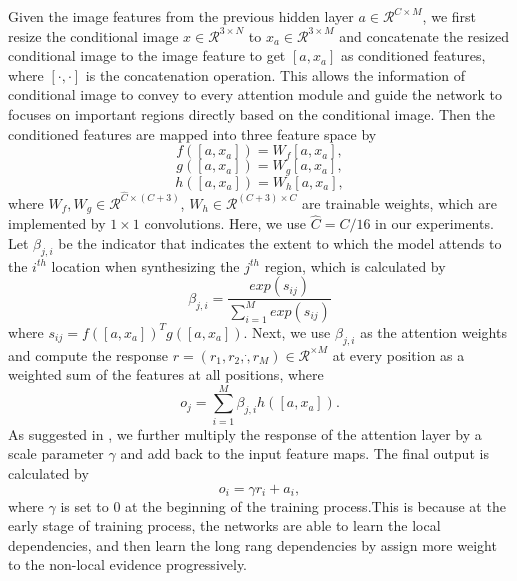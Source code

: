 Given the image features from the previous hidden layer $a\in \mathcal{R}^{C\times M}$, we first resize the conditional image $x\in \mathcal{R}^{3\times N}$ to  $x_a\in \mathcal{R}^{3\times M}$ and concatenate the resized conditional image to the image feature to get $[a, x_a]$ as conditioned features, where $[\cdot,\cdot]$ is the concatenation operation. This allows the information of conditional image to convey to every attention module and guide the network to focuses on important regions directly based on the conditional image.
%
Then the conditioned features are mapped into three feature space by
\begin{equation}
\label{eqn:f}
f([a, x_a])=W_f[a, x_a],
\end{equation}
\begin{equation}
\label{eqn:g}
g([a, x_a])=W_g[a, x_a],
\end{equation}
\begin{equation}
\label{eqn:h}
h([a, x_a])=W_h[a, x_a],
\end{equation}
where $W_f, W_g\in \mathcal{R}^{\hat{C}\times (C+3)}$, $W_h\in \mathcal{R}^{(C+3)\times C}$ are trainable weights, which are implemented by $1\times 1$ convolutions. Here, we use $\hat{C}=C/16$ in our experiments. 
%
Let $\beta_{j,i}$ be the indicator that indicates the extent to which the model attends to the $i^{th}$ location when synthesizing the $j^{th}$ region, which is calculated by 
\begin{equation}
\label{eqn:beta}
\beta_{j,i}=\frac{exp(s_{ij})}{\sum^M_{i=1}exp(s_{ij})}
\end{equation}
where $s_{ij}=f([a, x_a])^Tg([a, x_a])$. Next, we use $\beta_{j,i}$ as the attention weights and compute the response $r=(r_1, r_2,\dot, r_M)\in \mathcal{R}^{\times M}$ at every position as a weighted sum of the features at all positions, where
\begin{equation}
\label{eqn:response}
o_j=\sum^M_{i=1}\beta_{j,i}h([a, x_a]).
\end{equation}
As suggested in \cite{SAGANs}, we further multiply the response of the attention layer by a scale parameter $\gamma$ and add back to the input feature maps. The final output is calculated by 
\begin{equation}
\label{eqn:output}
o_i=\gamma r_i+a_i,
\end{equation}
where $\gamma$ is set to $0$ at the beginning of the training process.This is because at the early stage of training process, the networks are able to learn the local dependencies, and then learn the long rang dependencies by assign more weight to the non-local evidence progressively.
%
%
